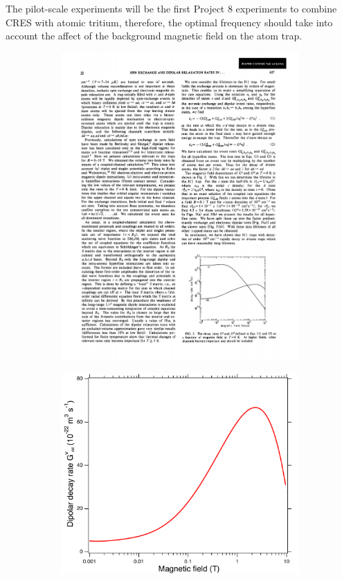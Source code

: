 The pilot-scale experiments will be the first Project 8 experiments to combine CRES with atomic tritium, therefore, the optimal frequency should take into account the affect of the background magnetic field on the atom trap.
\begin{figure}[htbp]
    \centering
    \begin{subfigure}{0.46\textwidth}
        \includegraphics*[width=\textwidth]{figs/Chapter-3/gloss.pdf}
        \caption{}
    \end{subfigure}
    \hfill
    \begin{subfigure}{0.49\textwidth}
        \includegraphics*[width=\textwidth]{figs/Chapter-3/dipolarloss.pdf}

\end{subfigure}
\end{figure}
